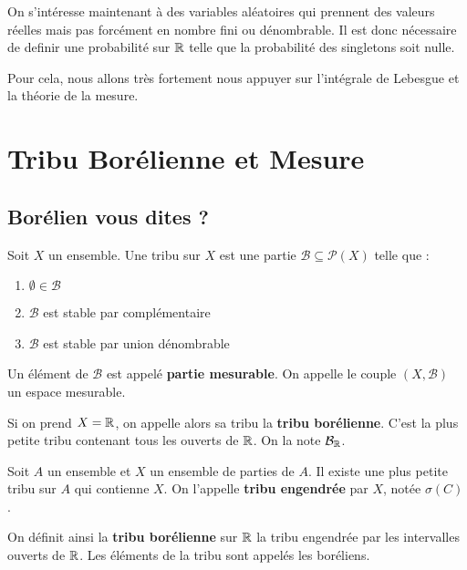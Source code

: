 
\minitoc  %


On s'intéresse maintenant à des variables aléatoires qui prennent des valeurs réelles mais pas forcément en nombre fini ou dénombrable.
Il est donc nécessaire de definir une probabilité sur $\mathbb{R}$ telle que la probabilité des singletons soit nulle.

Pour cela, nous allons très fortement nous appuyer sur l'intégrale de Lebesgue et la théorie de la mesure. 


\section{Tribu Borélienne et Mesure}

\subsection{Borélien vous dites ?}

\begin{definition}[Tribu]
    Soit $X$ un ensemble. Une tribu sur $X$ est une partie $ \mathcal{B} \subseteq \mathcal{P}(X)$ telle que :
    \begin{enumerate}[label=\roman*)]
        \item $\emptyset \in \mathcal{B}$ 
        \item $ \mathcal{B}$ est stable par complémentaire 
        \item $ \mathcal{B}$ est stable par union dénombrable
    \end{enumerate}
    Un élément de $ \mathcal{B}$ est appelé \textbf{partie mesurable}. 
    On appelle le couple $(X, \mathcal{B})$ un espace mesurable. 
\end{definition}

\begin{remark}
    Si on prend $X = \mathbb{R}$, on appelle alors sa tribu la \textbf{tribu borélienne}. 
    C'est la plus petite tribu contenant tous les ouverts de $\mathbb{R}$. 
    On la note $ \mathcal{B}_{\mathbb{R}}$. 
\end{remark}

\begin{proposition}
    Soit $A$ un ensemble et $X$ un ensemble de parties de $A$. Il existe une plus petite tribu sur 
    $A$ qui contienne $X$. On l'appelle \textbf{tribu engendrée} par $X$, notée $\sigma (C)$.

    On définit ainsi la \textbf{tribu borélienne} sur $\mathbb{R}$ la tribu engendrée par les intervalles ouverts de $\mathbb{R}$. 
    Les éléments de la tribu sont appelés les boréliens.
\end{proposition}

